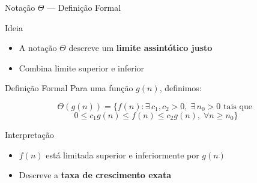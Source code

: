 \documentclass{beamer}
\begin{document}
\begin{frame}{Notação $\Theta$ — Definição Formal}

\begin{block}{Ideia}
\begin{itemize}
    \item A notação $\Theta$ descreve um \textbf{limite assintótico justo}
    \item Combina limite superior e inferior
\end{itemize}
\end{block}

\vspace{0.2cm}

\begin{block}{Definição Formal}
Para uma função $g(n)$, definimos:

\[
\Theta(g(n)) = \{ f(n) : \exists\, c_1, c_2 > 0,\; \exists\, n_0 > 0 \text{ tais que }
\]
\[
0 \leq c_1 g(n) \leq f(n) \leq c_2 g(n),\; \forall n \geq n_0 \}
\]
\end{block}

\vspace{0.2cm}

\begin{alertblock}{Interpretação}
\begin{itemize}
    \item $f(n)$ está limitada superior e inferiormente por $g(n)$
    \item Descreve a \textbf{taxa de crescimento exata}
\end{itemize}
\end{alertblock}

\end{frame}
\end{document}
